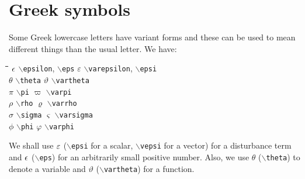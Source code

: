 \documentclass[11pt,dvips,a4paper]{article}
\newcommand{\type}[1]{{\tt$\backslash$#1}}
\begin{document}
\section{Greek symbols}
Some Greek lowercase letters have variant forms and these can
be used to mean different things than the usual letter.
We have:
\begin{tabbing}
\qquad\qquad \= \qquad\qquad\qquad\qquad\qquad\qquad \= \qquad\qquad \= \qquad\qquad \=  \kill
$\epsilon$ \> \type{epsilon}, \type{eps} \> $\varepsilon$ \> \type{varepsilon}, \type{epsi}  \\
$\theta$ \> \type{theta} \> $\vartheta$ \> \type{vartheta} \\
$\pi$ \> \type{pi} \> $\varpi$ \> \type{varpi} \\
$\rho$ \> \type{rho} \> $\varrho$ \> \type{varrho} \\
$\sigma$ \> \type{sigma} \> $\varsigma$ \> \type{varsigma} \\
$\phi$ \> \type{phi} \> $\varphi$ \> \type{varphi}
\end{tabbing}
We shall use $\varepsilon$ (\type{epsi} for a scalar, \type{vepsi} for a vector)
for a disturbance term and $\epsilon$ (\type{eps}) for
an arbitrarily small positive number.
Also, we use $\theta$ (\type{theta}) to denote a variable
and $\vartheta$ (\type{vartheta}) for a function.
%
\end{document}
